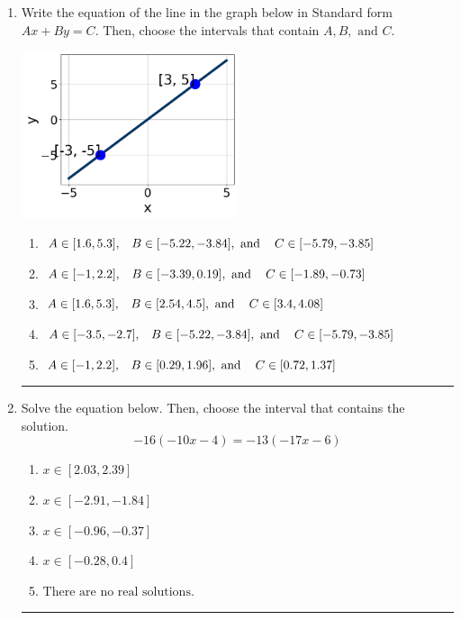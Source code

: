 \documentclass[14pt]{extbook}
\newcommand{\litem}[1]{\item#1\hspace*{-1cm}\rule{\textwidth}{0.4pt}}
\begin{document}
\begin{enumerate}
{\begin{enumerate}[label=\Alph*.]
\end{enumerate} }
\litem{
Write the equation of the line in the graph below in Standard form $Ax+By=C$. Then, choose the intervals that contain $A, B, \text{ and } C$.
\begin{center}
    \includegraphics[width=0.5\textwidth]{../Figures/linearGraphToStandardCopyC.png}
\end{center}
\begin{enumerate}[label=\Alph*.]
\item \( A \in [1.6, 5.3], \hspace{3mm} B \in [-5.22, -3.84], \text{ and } \hspace{3mm} C \in [-5.79, -3.85] \)
\item \( A \in [-1, 2.2], \hspace{3mm} B \in [-3.39, 0.19], \text{ and } \hspace{3mm} C \in [-1.89, -0.73] \)
\item \( A \in [1.6, 5.3], \hspace{3mm} B \in [2.54, 4.5], \text{ and } \hspace{3mm} C \in [3.4, 4.08] \)
\item \( A \in [-3.5, -2.7], \hspace{3mm} B \in [-5.22, -3.84], \text{ and } \hspace{3mm} C \in [-5.79, -3.85] \)
\item \( A \in [-1, 2.2], \hspace{3mm} B \in [0.29, 1.96], \text{ and } \hspace{3mm} C \in [0.72, 1.37] \)

\end{enumerate} }
\litem{
Solve the equation below. Then, choose the interval that contains the solution.\[ -16(-10x -4) = -13(-17x -6) \]\begin{enumerate}[label=\Alph*.]
\item \( x \in [2.03, 2.39] \)
\item \( x \in [-2.91, -1.84] \)
\item \( x \in [-0.96, -0.37] \)
\item \( x \in [-0.28, 0.4] \)
\item \( \text{There are no real solutions.} \)


\end{enumerate}}
\end{enumerate}
\end{document}
